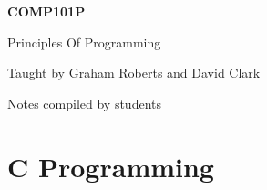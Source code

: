 \documentclass[12pt,a4paper]{report}
\begin{document}
    \begin{titlepage}
        \centering
        \bfseries
        \LARGE \textsc{COMP101P}\par
        \vspace{1cm}
        \Huge Principles Of Programming\par
        \vspace{1cm}
        \Large Taught by Graham Roberts and David Clark\par
        \vspace{1cm}
        \Large Notes compiled by students
    \end{titlepage}

    \tableofcontents

    \chapter{C Programming}
    

    \glsaddall
    \clearpage
    \printglossaries
\end{document}
